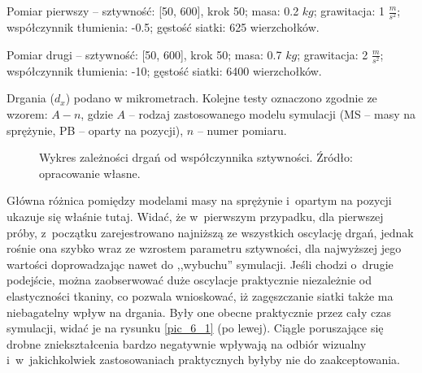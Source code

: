 		Pomiar pierwszy -- sztywność: [50, 600], krok 50; masa: 0.2 \(kg\); grawitacja: 1 \(\frac{m}{s^2}\); współczynnik tłumienia: -0.5; gęstość siatki: 625 wierzchołków.
		
		Pomiar drugi -- sztywność: [50, 600], krok 50; masa: 0.7 \(kg\); grawitacja: 2 \(\frac{m}{s^2}\); współczynnik tłumienia: -10; gęstość siatki: 6400 wierzchołków.
		
		Drgania (\(d_{x}\)) podano w mikrometrach. Kolejne testy oznaczono zgodnie ze wzorem: \(A-n\), gdzie \(A\) -- rodzaj zastosowanego modelu symulacji (MS -- masy na sprężynie, PB -- oparty na pozycji), \(n\) -- numer pomiaru.
		\newline
		
		
		\begin{figure}[H]
		\caption[Wykres zależności drgań od współczynnika sztywności.]{Wykres zależności drgań od współczynnika sztywności. Źródło: opracowanie własne.}
		\label{wykr_6_2}
		\end{figure}
		\pagebreak
		
		
		Główna różnica pomiędzy modelami masy na sprężynie i~opartym na pozycji ukazuje się właśnie tutaj. Widać, że w~pierwszym przypadku, dla pierwszej próby, z~początku zarejestrowano najniższą ze wszystkich oscylację drgań, jednak rośnie ona szybko wraz ze wzrostem parametru sztywności, dla najwyższej jego wartości doprowadzając nawet do ,,wybuchu'' symulacji. Jeśli chodzi o~drugie podejście, można zaobserwować duże oscylacje praktycznie niezależnie od elastyczności tkaniny, co pozwala wnioskować, iż zagęszczanie siatki także ma niebagatelny wpływ na drgania. Były one obecne praktycznie przez cały czas symulacji, widać je na rysunku \ref{pic_6_1} (po lewej). Ciągle poruszające się drobne zniekształcenia bardzo negatywnie wpływają na odbiór wizualny i~w~jakichkolwiek zastosowaniach praktycznych byłyby nie do zaakceptowania.
		
